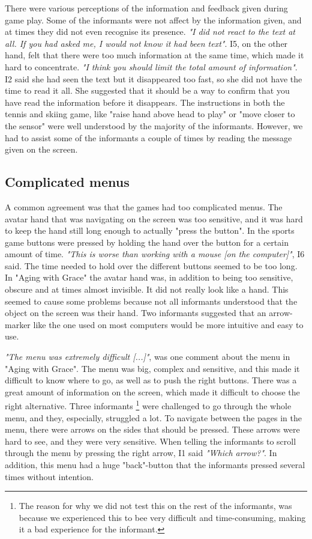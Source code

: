 There were various perceptions of the information and feedback given during game play. Some of the informants were not affect by the information given, and at times they did not even recognise its presence. \emph{"I did not react to the text at all. If you had asked me, I would not know it had been text"}. I5, on the other hand, felt that there were too much information at the same time, which made it hard to concentrate. \emph{"I think you should limit the total amount of information"}.  I2 said she had seen the text but it disappeared too fast, so she did not have the time to read it all. She suggested that it should be a way to confirm that you have read the information before it disappears. The instructions in both the tennis and skiing game, like "raise hand above head to play" or "move closer to the sensor" were well understood by the majority of the informants. However, we had to assist some of the informants a couple of times by reading the message given on the screen.  

\subsection{Complicated menus}
A common agreement was that the games had too complicated menus.  The avatar hand that was navigating on the screen was too sensitive, and it was hard to keep the hand still long enough to actually "press the button". In the sports game buttons were pressed by holding the hand over the button for a certain amount of time. \emph{"This is worse than working with a mouse [on the computer]"}, I6 said. The time needed to hold over the different buttons seemed to be too long. In "Aging with Grace" the avatar hand was, in addition to being too sensitive, obscure and at times almost invisible. It did not really look like a hand. This seemed to cause some problems because not all informants understood that the object on the screen was their hand. Two informants suggested that an arrow-marker like the one used on most computers would be more intuitive and easy to use. 

\emph{"The menu was extremely difficult [...]"}, was one comment about the menu in "Aging with Grace". The menu was big, complex and sensitive, and this made it difficult to know where to go, as well as to push the right buttons. There was a great amount of information on the screen, which made it difficult to choose the right alternative. Three informants \footnote{The reason for why we did not test this on the rest of the informants, was because we experienced this to bee very difficult and time-consuming, making it a bad experience for the informant.} were challenged to go through the whole menu, and they, especially, struggled a lot. To navigate between the pages in the menu, there were arrows on the sides that should be pressed. These arrows were hard to see, and they were very sensitive. When telling the informants to scroll through the menu by pressing the right arrow, I1 said \emph{"Which arrow?"}. In addition, this menu had a huge "back"-button that the informants pressed several times without intention. 

